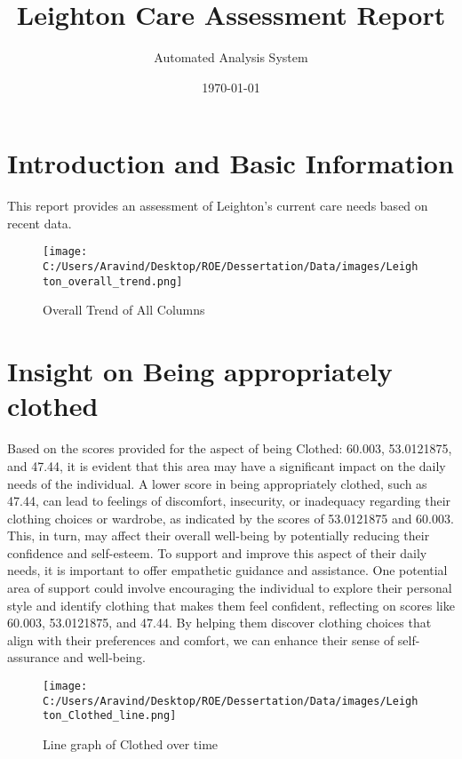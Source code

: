 \documentclass[10pt, a4paper]{article}%
\title{Leighton Care Assessment Report}%
\author{Automated Analysis System}%
\date{\today}%
\begin{document}
%
\normalsize%
\maketitle%
\section{Introduction and Basic Information}%
\label{sec:IntroductionandBasicInformation}%
This report provides an assessment of Leighton's current care needs based on recent data.%


\begin{figure}[H]%
\centering%
\texttt{[image: C:/Users/Aravind/Desktop/ROE/Dessertation/Data/images/Leighton\_overall\_trend.png]}%
\caption{Overall Trend of All Columns}%
\end{figure}

%
\section{Insight on Being appropriately clothed}%
\label{sec:InsightonBeingappropriatelyclothed}%
Based on the scores provided for the aspect of being Clothed: 60.003, 53.0121875, and 47.44, it is evident that this area may have a significant impact on the daily needs of the individual. A lower score in being appropriately clothed, such as 47.44, can lead to feelings of discomfort, insecurity, or inadequacy regarding their clothing choices or wardrobe, as indicated by the scores of 53.0121875 and 60.003. This, in turn, may affect their overall well{-}being by potentially reducing their confidence and self{-}esteem.\newline%
\newline%
To support and improve this aspect of their daily needs, it is important to offer empathetic guidance and assistance. One potential area of support could involve encouraging the individual to explore their personal style and identify clothing that makes them feel confident, reflecting on scores like 60.003, 53.0121875, and 47.44. By helping them discover clothing choices that align with their preferences and comfort, we can enhance their sense of self{-}assurance and well{-}being.%


\begin{figure}[H]%
\centering%
\texttt{[image: C:/Users/Aravind/Desktop/ROE/Dessertation/Data/images/Leighton\_Clothed\_line.png]}%
\caption{Line graph of Clothed over time}%
\end{figure}
\end{document}
